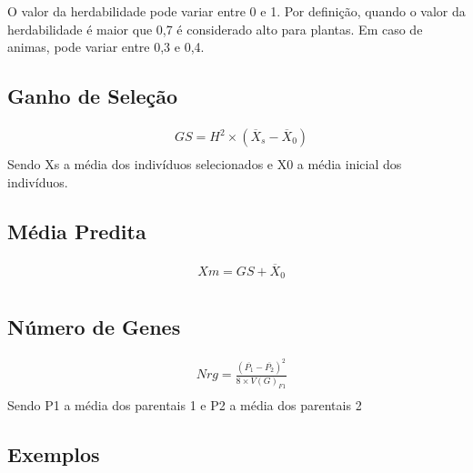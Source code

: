 O valor da herdabilidade pode variar entre 0 e 1. Por definição, quando o valor da herdabilidade é maior que 0,7 é considerado alto para plantas. Em caso de animas, pode variar entre 0,3 e 0,4.



\subsection{Ganho de Seleção}

\begin{definition}

\begin{align}
& GS = H^2 \times (\overline{X}_s - \overline{X}_0) \\
\end{align}
Sendo Xs a média dos indivíduos selecionados e X0 a média inicial dos indivíduos.
\end{definition}


\subsection{Média Predita}

\begin{definition}

\begin{align}
& Xm = GS + \overline{X}_0 \\
\end{align}
\end{definition}


\subsection{Número de Genes}


\begin{definition}

\begin{align}
& Nrg = \frac{(\overline{P_1} - \overline{P_2})^2}{8 \times V(G)_{F1}} \\
\end{align}
Sendo P1 a média dos parentais 1 e  P2 a média dos parentais 2 
\end{definition}

\subsection{Exemplos}

